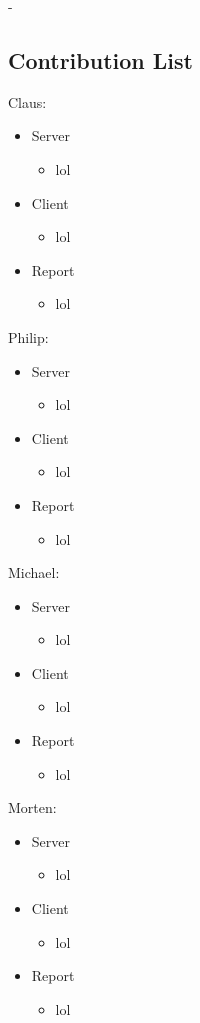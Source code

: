 -\subsection{Contribution List}
Claus: 
\begin{itemize}
	\item Server
	\begin{itemize}
		\item lol
	\end{itemize}
	\item Client
	\begin{itemize}
		\item lol
	\end{itemize}
	\item Report
	\begin{itemize}
		\item lol
	\end{itemize}
\end{itemize}
Philip:
\begin{itemize}
	\item Server
	\begin{itemize}
		\item lol
	\end{itemize}
	\item Client
	\begin{itemize}
		\item lol
	\end{itemize}
	\item Report
	\begin{itemize}
		\item lol
	\end{itemize}
\end{itemize} 
Michael: 
\begin{itemize}
	\item Server
	\begin{itemize}
		\item lol
	\end{itemize}
	\item Client
	\begin{itemize}
		\item lol
	\end{itemize}
	\item Report
	\begin{itemize}
		\item lol
	\end{itemize}
\end{itemize}
Morten: 
\begin{itemize}
	\item Server
	\begin{itemize}
		\item lol
	\end{itemize}
	\item Client
	\begin{itemize}
		\item lol
	\end{itemize}
	\item Report
	\begin{itemize}
		\item lol
	\end{itemize}
\end{itemize}
